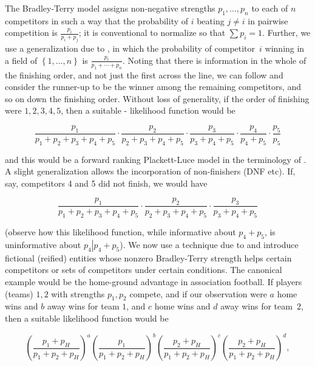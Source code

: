 \documentclass{elsarticle}
\begin{document}
The Bradley-Terry model \citep{bradley1952} assigns non-negative
strengths $p_1,\ldots, p_n$ to each of $n$ competitors in such a way
that the probability of $i$ beating $j\neq i$ in pairwise competition
is $\frac{p_i}{p_i+p_j}$; it is conventional to normalize so that
$\sum p_i=1$.  Further, we use a generalization due to
\citet{luce1959}, in which the probability of competitor~$i$ winning
in a field of $\left\lbrace 1,\ldots, n\right\rbrace$ is
$\frac{p_i}{p_1+\cdots +p_n}$.  Noting that there is information in the
whole of the finishing order, and not just the first across the line,
we can follow \cite{plackett1975} and consider the runner-up to be the
winner among the remaining competitors, and so on down the finishing
order. Without loss of generality, if the order of finishing were
$1,2,3,4,5$, then a suitable
\citeauthor{plackett1975}-\citeauthor{luce1959} likelihood function
would be

\begin{equation}\label{competitors_1_to_5_likelihood}
\frac{p_1}{p_1+p_2+p_3+p_4+p_5}\cdot
\frac{p_2}{p_2+p_3+p_4+p_5}\cdot
\frac{p_3}{p_3+p_4+p_5}\cdot
\frac{p_4}{p_4+p_5}\cdot
\frac{p_5}{p_5}
\end{equation}

and this would be a forward ranking Plackett-Luce model in the
terminology of \cite{mollica2014}. A slight generalization allows the
incorporation of non-finishers (DNF etc). If, say, competitors 4 and 5
did not finish, we would have

\begin{equation}\label{competitors_1_to_3_only_finished}
\frac{p_1}{p_1+p_2+p_3+p_4+p_5}\cdot
\frac{p_2}{p_2+p_3+p_4+p_5}\cdot
\frac{p_3}{p_3+p_4+p_5}
\end{equation}

(observe how this likelihood function, while informative about
$p_4+p_5$, is uninformative about $p_4\left|p_4+p_5\right.$). We now
use a technique due to \cite{hankin2010,hankin2020} and introduce
fictional (reified) entities whose nonzero Bradley-Terry strength
helps certain competitors or sets of competitors under certain
conditions. The canonical example would be the home-ground advantage
in association football.  If players (teams) $1,2$ with strengths
$p_1,p_2$ compete, and if our observation were $a$ home wins and $b$
away wins for team $1$, and $c$ home wins and $d$ away wins for
team~$2$, then a suitable likelihood function would be

\[
\left(\frac{p_1+p_H}{p_1+p_2+p_H}\right)^a
\left(\frac{p_1}{p_1+p_2+p_H}\right)^b
\left(\frac{p_2+p_H}{p_1+p_2+p_H}\right)^c
\left(\frac{p_2+p_H}{p_1+p_2+p_H}\right)^d,
\]
\end{document}
